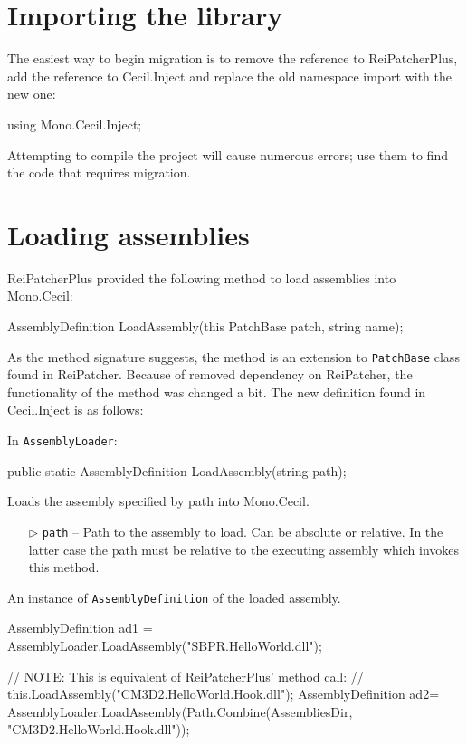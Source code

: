 \documentclass[a4paper,11pt]{article}
\newcommand{\CecilInject}{\textsc{C}{\scriptsize \sc ecil}.\textsc{I}{\scriptsize \sc nject}}
\begin{document}
\section{Importing the library}
The easiest way to begin migration is to remove the reference to ReiPatcherPlus, add the reference to \CecilInject{} and replace the old namespace import with the new one:
\begin{cs}
using Mono.Cecil.Inject;
\end{cs}
Attempting to compile the project will cause numerous errors; use them to find the code that requires migration.

\section{Loading assemblies}
ReiPatcherPlus provided the following method to load assemblies into Mono.Cecil:
\begin{cs}
AssemblyDefinition LoadAssembly(this PatchBase patch, string name);
\end{cs}
\vspace{-1em}
As the method signature suggests, the method is an extension to \texttt{PatchBase} class found in ReiPatcher. Because of removed dependency on ReiPatcher, the functionality of the method was changed a bit. The new definition found in \CecilInject{} is as follows:
\begin{mdef}
In \texttt{AssemblyLoader}:
\begin{cs}
public static AssemblyDefinition LoadAssembly(string path);
\end{cs}
Loads the assembly specified by path into Mono.Cecil.
\begin{itemize}
\item[$\triangleright$] \texttt{path} -- Path to the assembly to load. Can be absolute or relative. In the latter case the path must be relative to the executing assembly which invokes this method.
\end{itemize}
An instance of \texttt{AssemblyDefinition} of the loaded assembly.
\begin{cs}
	AssemblyDefinition ad1 = AssemblyLoader.LoadAssembly("SBPR.HelloWorld.dll");
	
	// NOTE: This is equivalent of ReiPatcherPlus' method call:
	// this.LoadAssembly("CM3D2.HelloWorld.Hook.dll");
	AssemblyDefinition ad2= AssemblyLoader.LoadAssembly(Path.Combine(AssembliesDir, "CM3D2.HelloWorld.Hook.dll"));
\end{cs}
\end{mdef}
\end{document}
